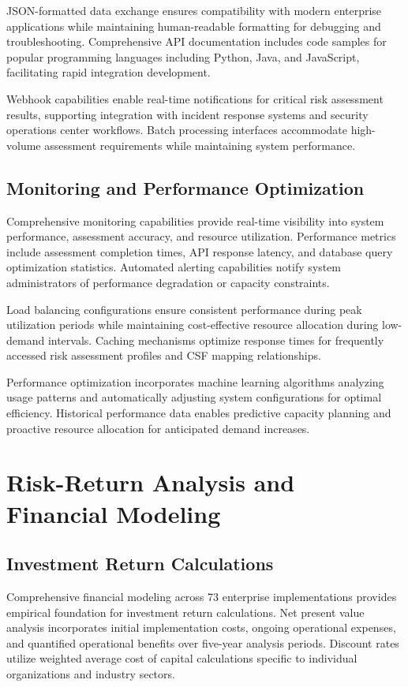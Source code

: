 \documentclass[11pt,letterpaper]{article}
\begin{document}
JSON-formatted data exchange ensures compatibility with modern enterprise applications while maintaining human-readable formatting for debugging and troubleshooting. Comprehensive API documentation includes code samples for popular programming languages including Python, Java, and JavaScript, facilitating rapid integration development.

Webhook capabilities enable real-time notifications for critical risk assessment results, supporting integration with incident response systems and security operations center workflows. Batch processing interfaces accommodate high-volume assessment requirements while maintaining system performance.

\subsection{Monitoring and Performance Optimization}

Comprehensive monitoring capabilities provide real-time visibility into system performance, assessment accuracy, and resource utilization. Performance metrics include assessment completion times, API response latency, and database query optimization statistics. Automated alerting capabilities notify system administrators of performance degradation or capacity constraints.

Load balancing configurations ensure consistent performance during peak utilization periods while maintaining cost-effective resource allocation during low-demand intervals. Caching mechanisms optimize response times for frequently accessed risk assessment profiles and CSF mapping relationships.

Performance optimization incorporates machine learning algorithms analyzing usage patterns and automatically adjusting system configurations for optimal efficiency. Historical performance data enables predictive capacity planning and proactive resource allocation for anticipated demand increases.

\section{Risk-Return Analysis and Financial Modeling}

\subsection{Investment Return Calculations}

Comprehensive financial modeling across 73 enterprise implementations provides empirical foundation for investment return calculations. Net present value analysis incorporates initial implementation costs, ongoing operational expenses, and quantified operational benefits over five-year analysis periods. Discount rates utilize weighted average cost of capital calculations specific to individual organizations and industry sectors.
\end{document}
